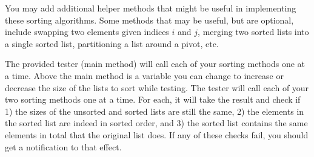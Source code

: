 \documentclass[paper=a4, fontsize=11pt, parskip=full]{scrartcl} %
\numberwithin{equation}{section} %
\numberwithin{figure}{section} %
\numberwithin{table}{section} %
\begin{document}
You may add additional helper methods that might be useful in implementing these sorting algorithms. Some methods that may be useful, but are optional, include swapping two elements given indices $i$ and $j$, merging two sorted lists into a single sorted list, partitioning a list around a pivot, etc. 

The provided tester (main method) will call each of your sorting methods one at a time. Above the main method is a variable you can change to increase or decrease the size of the lists to sort while testing. The tester will call each of your two sorting methods one at a time. For each, it will take the result and check if 1) the sizes of the unsorted and sorted lists are still the same, 2) the elements in the sorted list are indeed in sorted order, and 3) the sorted list contains the same elements in total that the original list does. If any of these checks fail, you should get a notification to that effect.




\end{document}
